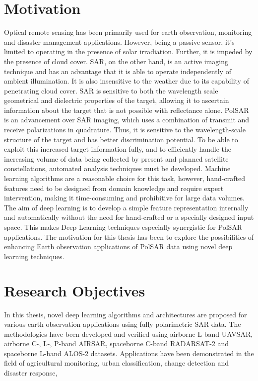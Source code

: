\section{Motivation}
Optical remote sensing has been primarily used for earth observation, monitoring and disaster management applications. However, being a passive sensor, it's limited to operating in the presence of solar irradiation. Further, it is impeded by the presence of cloud cover. SAR, on the other hand, is an active imaging technique and has an advantage that it is able to operate independently of ambient illumination. It is also insensitive to the weather due to its capability of penetrating cloud cover. SAR is sensitive to both the wavelength scale geometrical and dielectric properties of the target, allowing it to ascertain information about the target that is not possible with reflectance alone. PolSAR is an advancement over SAR imaging, which uses a combination of transmit and receive polarizations in quadrature. Thus, it is sensitive to the wavelength-scale structure of the target and has better discrimination potential. To be able to exploit this increased target information fully, and to efficiently handle the increasing volume of data being collected by present and planned satellite constellations, automated analysis techniques must be developed. Machine learning algorithms are a reasonable choice for this task, however, hand-crafted features need to be designed from domain knowledge and require expert intervention, making it time-consuming and prohibitive for large data volumes. The aim of deep learning is to develop a simple feature representation internally and automatically without the need for hand-crafted or a specially designed input space. This makes Deep Learning techniques especially synergistic for PolSAR applications. The motivation for this thesis has been to explore the possibilities of enhancing Earth observation applications of PolSAR data using novel deep learning techniques. 


\section{Research Objectives}
In this thesis, novel deep learning algorithms and architectures are proposed for various earth observation applications using fully polarimetric SAR data.
The methodologies have been developed and verified using airborne L-band UAVSAR, airborne C-, L-, P-band AIRSAR, spaceborne C-band RADARSAT-2 and spaceborne L-band ALOS-2 datasets. Applications have been demonstrated in the field of agricultural monitoring, urban classification, change detection and disaster response, 

